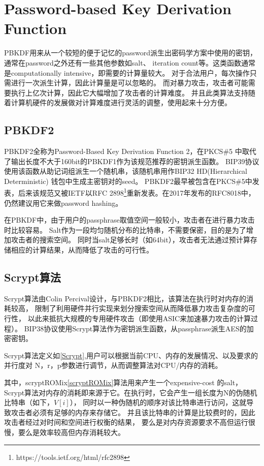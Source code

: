 \section{Password-based Key Derivation Function}
PBKDF用来从一个较短的便于记忆的password派生出密码学方案中使用的密钥，通常在password之外还有一些其他参数如salt、
iteration count等。这类函数通常是computationally intensive，即需要的计算量较大。
对于合法用户，每次操作只需进行一次派生计算，因此计算量是可以忽略的。
而对暴力攻击，攻击者可能需要执行上亿次计算，因此它大幅增加了攻击者的计算难度。
并且此类算法支持随着计算机硬件的发展做对计算难度进行灵活的调整，使用起来十分方便。

\subsection{PBKDF2}
PBKDF2全称为Password-Based Key Derivation Function 2，在PKCS\#5
中取代了输出长度不大于160bit的PBKDF1作为该规范推荐的密钥派生函数。
BIP39协议使用该函数从助记词组派生一个随机串，该随机串用作BIP32 HD(Hierarchical Deterministic)
钱包中生成主密钥对的seed。  PBKDF2最早被包含在PKCS\#5中发表，后来该规范又被IETF以RFC 
2898\footnote{https://tools.ietf.org/html/rfc2898}重新发表。在2017年发布的RFC8018中，仍然建议用它来做password hashing。

在PBKDF中，由于用户的passphrase取值空间一般较小，攻击者在进行暴力攻击时比较容易。
Salt作为一段均匀随机分布的比特串，不需要保密，目的是为了增加攻击者的搜索空间。
同时当salt足够长时（如64bit），攻击者无法通过预计算存储相应的计算结果，从而降低了攻击的可行性。

\subsection{Scrypt算法}
Scrypt算法由Colin Percival设计，与PBKDF2相比，该算法在执行时对内存的消耗较高，
限制了利用硬件并行实现来划分搜索空间从而降低暴力攻击复杂度的可行性，
以此来抵抗大规模的专用硬件攻击（即使用ASIC来加速暴力攻击的计算过程）。
BIP38协议使用Scrypt算法作为密钥派生函数，从passphrase派生AES的加密密钥。 
 
Scrypt算法定义如\ref{Scrypt},用户可以根据当前CPU、内存的发展情况、以及要求的并行度对
N，r，p参数进行调节，从而调整算法对CPU/内存的消耗。

其中，scryptROMix\ref{scryptROMix}算法用来产生一个expensive-cost 的salt，Scrypt算法对内存的消耗即来源于它。在执行时，它会产生一组长度为N的伪随机比特串（如下，$V[i]$），
同时以一种伪随机的顺序对该比特串进行访问，这就导致攻击者必须有足够的内存来存储它。
并且该比特串的计算是比较费时的，因此攻击者经过对时间和空间进行权衡的结果，
要么是对内存资源要求不高但运行很慢，要么是效率较高但内存消耗较大。

